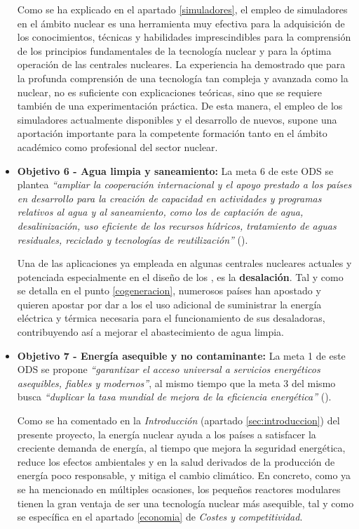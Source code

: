 \begin{itemize}
    Como se ha explicado en el apartado \ref{simuladores}, el empleo de simuladores en el ámbito nuclear es una herramienta muy efectiva para la adquisición de los conocimientos, técnicas y habilidades imprescindibles para la comprensión de los principios fundamentales de la tecnología nuclear y para la óptima operación de las centrales nucleares. La experiencia ha demostrado que para la profunda comprensión de una tecnología tan compleja y avanzada como la nuclear, no es suficiente con explicaciones teóricas, sino que se requiere también de una experimentación práctica.  De esta manera, el empleo de los simuladores actualmente disponibles y el desarrollo de nuevos, supone una aportación importante para la competente formación tanto en el ámbito académico como profesional del sector nuclear.

    \item \textbf{Objetivo 6 - Agua limpia y saneamiento:} La meta 6 de este ODS se plantea \textit{``ampliar la cooperación internacional y el apoyo prestado a los países en desarrollo para la creación de capacidad en actividades y programas relativos al agua y al saneamiento, como los de captación de agua, desalinización, uso eficiente de los recursos hídricos, tratamiento de aguas residuales, reciclado y tecnologías de reutilización''} (\cite{ODS}).
    
    Una de las aplicaciones ya empleada en algunas centrales nucleares actuales y potenciada especialmente en el diseño de los , es la \textbf{desalación}. Tal y como se detalla en el punto \ref{cogeneracion}, numerosos países han apostado y quieren apostar por dar a los  el uso adicional de suministrar la energía eléctrica y térmica necesaria para el funcionamiento de sus desaladoras, contribuyendo así a mejorar el abastecimiento de agua limpia.

    \item \textbf{Objetivo 7 - Energía asequible y no contaminante:} La meta 1 de este ODS se propone \textit{``garantizar el acceso universal a servicios energéticos asequibles, fiables y modernos''}, al mismo tiempo que la meta 3 del mismo busca \textit{``duplicar la tasa mundial de mejora de la eficiencia energética''} (\cite{ODS}).
    
    Como se ha comentado en la \textit{Introducción} (apartado \ref{sec:introduccion}) del presente proyecto, la energía nuclear ayuda a los países a satisfacer la creciente demanda de energía, al tiempo que mejora la seguridad energética, reduce los efectos ambientales y en la salud derivados de la producción de energía poco responsable, y mitiga el cambio climático. En concreto, como ya se ha mencionado en múltiples ocasiones, los pequeños reactores modulares tienen la gran ventaja de ser una tecnología nuclear más asequible, tal y como se específica en el apartado \ref{economia} de \textit{Costes y competitividad}.


\end{itemize}
